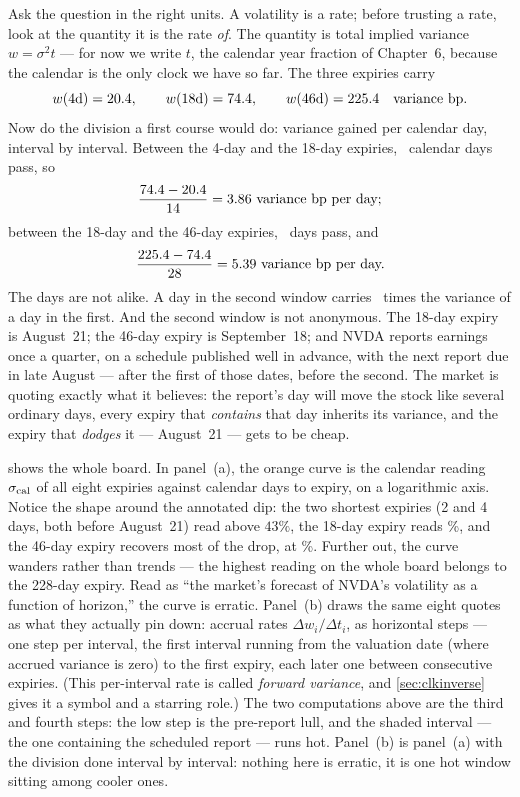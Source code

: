Ask the question in the right units.  A volatility is a rate; before
trusting a rate, look at the quantity it is the rate \emph{of}.  The
quantity is total implied variance $w=\sigma^2 t$ --- for now we write
$t$, the calendar year fraction of Chapter~6, because the calendar is
the only clock we have so far.  The three expiries carry
\[
w(\text{4d})=20.4,\qquad
w(\text{18d})=74.4,\qquad
w(\text{46d})=225.4
\quad\text{variance bp.}
\]
Now do the division a first course would do: variance gained per
calendar day, interval by interval.  Between the 4-day and the 18-day
expiries, \MacClkBoardLullDays\ calendar days pass, so
\[
\frac{74.4-20.4}
     {14}
=3.86\ \text{variance bp per day;}
\]
between the 18-day and the 46-day expiries, \MacClkBoardHotDays\ days
pass, and
\[
\frac{225.4-74.4}
     {28}
=5.39\ \text{variance bp per day.}
\]
The days are not alike.  A day in the second window carries
\MacClkBoardHotOverLull\ times the variance of a day in the first.
And the second window is not anonymous.  The 18-day expiry is
August~21; the 46-day expiry is September~18; and NVDA reports
earnings once a quarter, on a schedule published well in advance,
with the next report due in late August --- after the first of those
dates, before the second.  The market is quoting exactly what it
believes: the report's day will move the stock like several ordinary
days, every expiry that \emph{contains} that day inherits its
variance, and the expiry that \emph{dodges} it --- August~21 --- gets
to be cheap.

 shows the whole board.  In panel~(a), the orange
curve is the calendar reading $\sigma_{\rm cal}$ of all eight
expiries against calendar days to expiry, on a logarithmic axis.
Notice the shape around the annotated dip: the two shortest expiries
(2 and 4 days, both before August~21) read above $43\%$, the 18-day
expiry reads \MacClkBoardVolEighteenDPct\%, and the 46-day expiry
recovers most of the drop, at \MacClkBoardVolFortySixDPct\%.
Further out, the curve wanders rather than trends --- the highest
reading on the whole board belongs to the 228-day expiry.  Read as
``the market's forecast of NVDA's volatility as a function of
horizon,'' the curve is erratic.  Panel~(b) draws the same eight
quotes as what they actually pin down: accrual rates
$\Delta w_i/\Delta t_i$, as horizontal steps --- one step per
interval, the first interval running from the valuation date (where
accrued variance is zero) to the first expiry, each later one
between consecutive expiries.  (This per-interval rate is called
\emph{forward variance}, and \cref{sec:clkinverse} gives it a symbol
and a starring role.)  The two computations above are the third and
fourth steps: the low step is the pre-report lull, and the shaded
interval --- the one containing the scheduled report --- runs hot.
Panel~(b) is panel~(a) with the division done interval by interval:
nothing here is erratic, it is one hot window sitting among cooler
ones.


